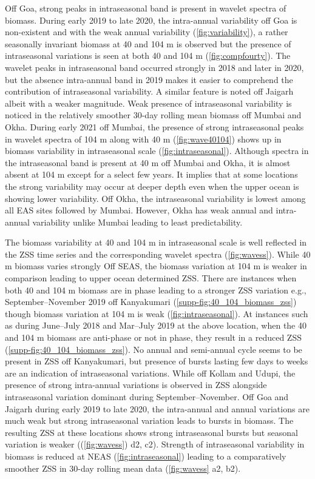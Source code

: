 \documentclass{article}
\begin{document}
	Off Goa, strong peaks in intraseasonal band is present in wavelet spectra of biomass. During early 2019 to late 2020, the intra-annual variability off Goa is non-existent and with the weak annual variability (\cref{fig:variability}), a rather seasonally invariant biomass at 40 and 104 m is observed but the presence of intraseasonal variations is seen at both 40 and 104 m (\cref{fig:compfourty}). The wavelet peaks in intraseasonal band occurred strongly in 2018 and later in 2020, but the absence intra-annual band in 2019 makes it easier to comprehend the contribution of intraseasonal variability. A similar feature is noted off Jaigarh albeit with a weaker magnitude. 
	Weak presence of intraseasonal variability is noticed in the relatively smoother 30-day rolling mean biomass off Mumbai and Okha. During early 2021 off Mumbai, the presence of strong intraseasonal peaks in wavelet spectra of 104 m along with 40 m (\cref{fig:wave40104}) shows up in biomass variability in intraseasonal scale (\cref{fig:intraseasonal}). Although spectra in the intraseasonal band is present at 40 m off Mumbai and Okha, it is almost absent at 104 m  except for a select few years.  It implies that at some locations the strong variability may occur at deeper depth even when the upper ocean is showing lower variability. Off Okha, the intraseasonal variability is lowest among all EAS sites followed by Mumbai. However, Okha has weak annual and intra-annual variability unlike Mumbai leading to least predictability.
	
	The biomass variability at 40 and 104 m in intraseasonal scale is well reflected in the ZSS time series and the corresponding wavelet spectra (\cref{fig:wavess}). While 40 m biomass varies strongly Off SEAS, the biomass variation at 104 m is weaker in comparison leading to upper ocean determined ZSS. There are instances when both 40 and 104 m biomass are in phase leading to a stronger ZSS variation e.g., September--November 2019 off Kanyakumari (\cref{supp-fig:40_104_biomass_zss}) though biomass variation at 104 m is weak (\cref{fig:intraseasonal}). At instances such as during June--July 2018 and Mar--July 2019 at the above location, when the 40 and 104 m biomass are anti-phase or not in phase, they result in a reduced ZSS (\cref{supp-fig:40_104_biomass_zss}). No annual and semi-annual cycle seems to be present in ZSS off Kanyakumari, but presence of bursts lasting few days to weeks are an indication of intraseasonal variations. While off Kollam and Udupi, the presence of strong intra-annual variations is observed in ZSS alongside intraseasonal variation dominant during September--November. Off Goa and Jaigarh during early 2019 to late 2020, the intra-annual and annual variations are much weak but strong intraseasonal variation leads to bursts in biomass. The resulting ZSS at these locations shows strong intraseasonal bursts but seasonal variation is weaker ((\cref{fig:wavess}) d2, c2). Strength of intraseasonal variability in biomass is reduced at NEAS (\cref{fig:intraseasonal}) leading to a comparatively smoother ZSS in 30-day rolling mean data (\cref{fig:wavess} a2, b2). 
	
\end{document}
